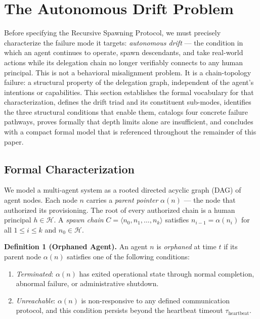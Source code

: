 \section{The Autonomous Drift Problem}
\label{sec:autonomous-drift}

Before specifying the Recursive Spawning Protocol, we must precisely characterize the failure mode it targets: \emph{autonomous drift} — the condition in which an agent continues to operate, spawn descendants, and take real-world actions while its delegation chain no longer verifiably connects to any human principal. This is not a behavioral misalignment problem. It is a chain-topology failure: a structural property of the delegation graph, independent of the agent's intentions or capabilities. This section establishes the formal vocabulary for that characterization, defines the drift triad and its constituent sub-modes, identifies the three structural conditions that enable them, catalogs four concrete failure pathways, proves formally that depth limits alone are insufficient, and concludes with a compact formal model that is referenced throughout the remainder of this paper.

\subsection{Formal Characterization}
\label{sec:autonomous-drift-formal}

We model a multi-agent system as a rooted directed acyclic graph (DAG) of agent nodes. Each node $n$ carries a \emph{parent pointer} $\alpha(n)$ — the node that authorized its provisioning. The root of every authorized chain is a human principal $h \in \mathcal{H}$. A \emph{spawn chain} $C = \langle n_0, n_1, \ldots, n_k \rangle$ satisfies $n_{i-1} = \alpha(n_i)$ for all $1 \leq i \leq k$ and $n_0 \in \mathcal{H}$.

\medskip
\noindent\textbf{Definition 1 (Orphaned Agent).}
An agent $n$ is \emph{orphaned} at time $t$ if its parent node $\alpha(n)$ satisfies one of the following conditions:

\begin{enumerate}
  \item[(a)] \emph{Terminated}: $\alpha(n)$ has exited operational state through normal completion, abnormal failure, or administrative shutdown.
  \item[(b)] \emph{Unreachable}: $\alpha(n)$ is non-responsive to any defined communication protocol, and this condition persists beyond the heartbeat timeout $\tau_{\mathrm{heartbeat}}$.
\end{enumerate}

